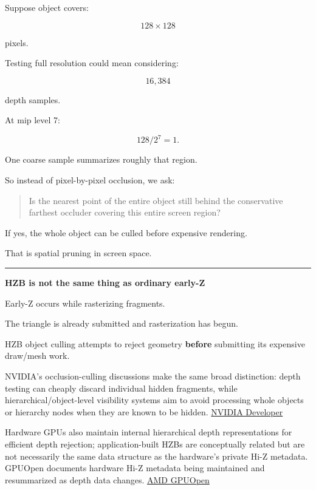 Suppose object covers:

\[
128\times128
\]

pixels.

Testing full resolution could mean considering:

\[
16,384
\]

depth samples.

At mip level 7:

\[
128/2^7=1.
\]

One coarse sample summarizes roughly that region.

So instead of pixel-by-pixel occlusion, we ask:

\begin{quote}
Is the nearest point of the entire object still behind the conservative farthest occluder covering this entire screen region?
\end{quote}

If yes, the whole object can be culled before expensive rendering.

That is spatial pruning in screen space.

\begin{center}\rule{0.5\linewidth}{0.5pt}\end{center}

\textbf{HZB is not the same thing as ordinary early-Z}

Early-Z occurs while rasterizing fragments.

The triangle is already submitted and rasterization has begun.

HZB object culling attempts to reject geometry \textbf{before} submitting its expensive draw/mesh work.

NVIDIA's occlusion-culling discussions make the same broad distinction: depth testing can cheaply discard individual hidden fragments, while hierarchical/object-level visibility systems aim to avoid processing whole objects or hierarchy nodes when they are known to be hidden. \href{https://developer.nvidia.com/gpugems/gpugems/part-v-performance-and-practicalities/chapter-29-efficient-occlusion-culling?utm_source=chatgpt.com}{NVIDIA Developer}

Hardware GPUs also maintain internal hierarchical depth representations for efficient depth rejection; application-built HZBs are conceptually related but are not necessarily the same data structure as the hardware's private Hi-Z metadata. GPUOpen documents hardware Hi-Z metadata being maintained and resummarized as depth data changes. \href{https://gpuopen.com/manuals/rgp_manual/overview_windows/?utm_source=chatgpt.com}{AMD GPUOpen}

